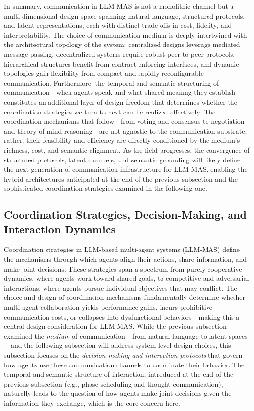 \documentclass[11pt]{article}
\begin{document}
In summary, communication in LLM-MAS is not a monolithic channel but a multi-dimensional design space spanning natural language, structured protocols, and latent representations, each with distinct trade-offs in cost, fidelity, and interpretability. The choice of communication medium is deeply intertwined with the architectural topology of the system: centralized designs leverage mediated message passing, decentralized systems require robust peer-to-peer protocols, hierarchical structures benefit from contract-enforcing interfaces, and dynamic topologies gain flexibility from compact and rapidly reconfigurable communication. Furthermore, the temporal and semantic structuring of communication---when agents speak and what shared meaning they establish---constitutes an additional layer of design freedom that determines whether the coordination strategies we turn to next can be realized effectively. The coordination mechanisms that follow---from voting and consensus to negotiation and theory-of-mind reasoning---are not agnostic to the communication substrate; rather, their feasibility and efficiency are directly conditioned by the medium's richness, cost, and semantic alignment. As the field progresses, the convergence of structured protocols, latent channels, and semantic grounding will likely define the next generation of communication infrastructure for LLM-MAS, enabling the hybrid architectures anticipated at the end of the previous subsection and the sophisticated coordination strategies examined in the following one.

\subsection{Coordination Strategies, Decision-Making, and Interaction Dynamics}

Coordination strategies in LLM-based multi-agent systems (LLM-MAS) define the mechanisms through which agents align their actions, share information, and make joint decisions. These strategies span a spectrum from purely cooperative dynamics, where agents work toward shared goals, to competitive and adversarial interactions, where agents pursue individual objectives that may conflict. The choice and design of coordination mechanisms fundamentally determine whether multi-agent collaboration yields performance gains, incurs prohibitive communication costs, or collapses into dysfunctional behaviors---making this a central design consideration for LLM-MAS. While the previous subsection examined the \emph{medium} of communication---from natural language to latent spaces---and the following subsection will address system-level design choices, this subsection focuses on the \emph{decision-making and interaction protocols} that govern how agents use these communication channels to coordinate their behavior. The temporal and semantic structure of interaction, introduced at the end of the previous subsection (e.g., phase scheduling and thought communication), naturally leads to the question of how agents make joint decisions given the information they exchange, which is the core concern here.
\end{document}
